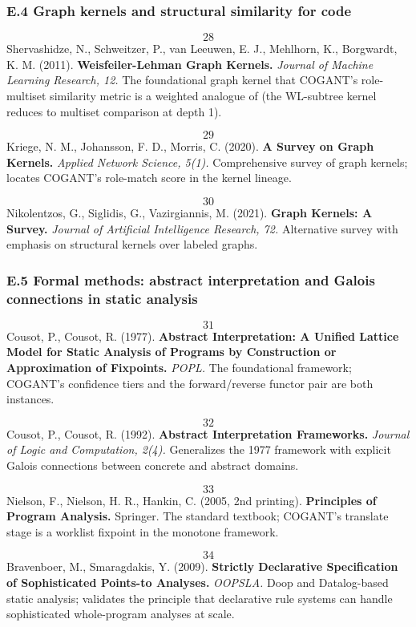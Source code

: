 \documentclass[
]{article}
\begin{document}
\subsubsection{E.4 Graph kernels and structural similarity for
code}\label{e.4-graph-kernels-and-structural-similarity-for-code}

\[28\] Shervashidze, N., Schweitzer, P., van Leeuwen, E. J., Mehlhorn,
K., Borgwardt, K. M. (2011). \textbf{Weisfeiler-Lehman Graph Kernels.}
\emph{Journal of Machine Learning Research, 12.} The foundational graph
kernel that COGANT's role-multiset similarity metric is a weighted
analogue of (the WL-subtree kernel reduces to multiset comparison at
depth 1).

\[29\] Kriege, N. M., Johansson, F. D., Morris, C. (2020). \textbf{A
Survey on Graph Kernels.} \emph{Applied Network Science, 5(1).}
Comprehensive survey of graph kernels; locates COGANT's role-match score
in the kernel lineage.

\[30\] Nikolentzos, G., Siglidis, G., Vazirgiannis, M. (2021).
\textbf{Graph Kernels: A Survey.} \emph{Journal of Artificial
Intelligence Research, 72.} Alternative survey with emphasis on
structural kernels over labeled graphs.

\subsubsection{E.5 Formal methods: abstract interpretation and Galois
connections in static
analysis}\label{e.5-formal-methods-abstract-interpretation-and-galois-connections-in-static-analysis}

\[31\] Cousot, P., Cousot, R. (1977). \textbf{Abstract Interpretation:
A Unified Lattice Model for Static Analysis of Programs by Construction
or Approximation of Fixpoints.} \emph{POPL.} The foundational framework;
COGANT's confidence tiers and the forward/reverse functor pair are both
instances.

\[32\] Cousot, P., Cousot, R. (1992). \textbf{Abstract Interpretation
Frameworks.} \emph{Journal of Logic and Computation, 2(4).} Generalizes
the 1977 framework with explicit Galois connections between concrete and
abstract domains.

\[33\] Nielson, F., Nielson, H. R., Hankin, C. (2005, 2nd printing).
\textbf{Principles of Program Analysis.} Springer. The standard
textbook; COGANT's translate stage is a worklist fixpoint in the
monotone framework.

\[34\] Bravenboer, M., Smaragdakis, Y. (2009). \textbf{Strictly
Declarative Specification of Sophisticated Points-to Analyses.}
\emph{OOPSLA.} Doop and Datalog-based static analysis; validates the
principle that declarative rule systems can handle sophisticated
whole-program analyses at scale.
\end{document}

